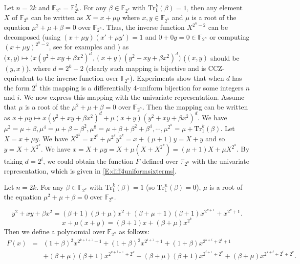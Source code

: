 \documentclass[12pt,a4paper]{ctexbook}
\newcommand{\0}{\textbf{0}}
\newcommand{\1}{\textbf{1}}
\newcommand{\F}{\mathbb{F}}
\begin{document}
    Let $n=2k$ and $\F_{2^n}=\F_{2^k}^2$. For any $\beta\in\F_{2^k}$ with $\mathrm{Tr}_1^k(\beta)=1$,
    then any element $X$ of $\F_{2^n}$ can be written as $X=x+\mu y$ where $x,y\in\F_{2^k}$ and $\mu$ is a root of the equation
    $\mu^2+\mu+\beta=0$ over $\F_{2^n}$. Thus, the inverse function $X^{2^n-2}$ can be decomposed
    (using $(x+\mu y)(x'+\mu y')=1$ and $0+0y=0\in\F_{2^n}$ or computing $(x+\mu y)^{2^n-2}$, see for examples \cite{Dumas2014arXiv} and \cite[Theorem 5]{PerrinUBCRYPTO16}) as
    $\big(x,y\big)\mapsto \big(x(y^2+xy+\beta x^2)^{d}, (x+y)(y^2+xy+\beta x^2)^{d}\big)$ ($(x,y)$ should be $(y,x)$),
    where $d={2^k-2}$ (clearly such mapping is bijective and is CCZ-equivalent to the inverse function over $\F_{2^n}$).
    Experiments show that when $d$ has the form $2^i$ this mapping is a differentially 4-uniform bijection
    for some integers $n$ and $i$. We now express this mapping with the univariate representation.
    Assume that $\mu$ is a root of the $\mu^2+\mu+\beta=0$ over $\F_{2^n}$.
    Then the mapping 
    can be written as $x+\mu y\mapsto x(y^2+xy+\beta x^2)^{d}+\mu(x+y)(y^2+xy+\beta x^2)^{d}$.
    We have $\mu^2=\mu+\beta,\mu^4=\mu+\beta+\beta^2,\mu^8=\mu+\beta+\beta^2+\beta^4,\cdots,\mu^{2^k}=\mu+\mathrm{Tr}_1^k(\beta)$.
    Let $X=x+\mu y$. We have $X^{2^k}=x^{2^k}+\mu^{2^k}y^{2^k}=x+(\mu+1)y=X+y$ and so $y=X+X^{2^k}$.
    We have $x=X+\mu y=X+\mu(X+X^{2^k})=(\mu+1)X+\mu X^{2^k}$. By taking $d=2^i$, we could obtain the
    function $F$ defined over $\F_{2^n}$ with the univariate representation, which is given in \eqref{E:diff4uniformsixterms}.
    
    
    Let $n=2k$.
    For any $\beta\in\F_{2^k}$ with $\mathrm{Tr}_1^k(\beta)=1$ (so $\mathrm{Tr}_1^n(\beta)=0$),
    $\mu$ is a root of the equation $\mu^2+\mu+\beta=0$ over $\F_{2^n}$.

    \[y^2+xy+\beta x^2=(\beta+1)(\beta+\mu)x^2+(\beta+\mu+1)(\beta+1)x^{2^{k+1}}+x^{2^k+1}.\]
    \[x+\mu(x+y)=(\beta+1)x+(\beta+\mu)x^{2^k}\]
    Then we define a polynomial over $\F_{2^n}$ as follows:
    \begin{eqnarray}\label{E:diff4uniformsixterms}
    F(x)&=&(1+\beta)^2 x^{2^{k+i+1}+1}+(1+\beta)^2 x^{2^{i+1}+1}+(1+\beta) x^{2^{k+i}+2^i+1}\\
    &&+(\beta+\mu)(\beta+1) x^{2^{k+i+1}+2^k}+(\beta+\mu)(\beta+1) x^{2^{i+1}+2^k}+(\beta+\mu) x^{2^{k+i}+2^i+2^k}\nonumber.
    \end{eqnarray}
    
\end{document}
